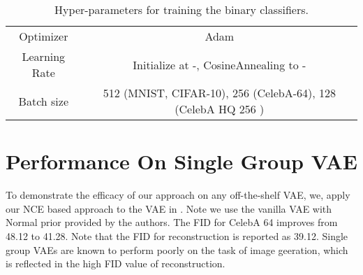 \documentclass{article} \usepackage{iclr2021_conference,times}
\begin{document}
\begin{table}[h]
\centering
{}
\end{table}

\begin{table}[h]
\centering
\begin{tabular}{c||c}
    Optimizer & Adam \citep{kingma2014adam} \\ 
    Learning Rate & Initialize at -, CosineAnnealing \citep{loshchilov2016sgdr} to - \\
    Batch size & 512 \small{(MNIST, CIFAR-10)}, 256 \small{(CelebA-64)}, 128 \small{(CelebA HQ 256 )} 
\end{tabular}
\caption{Hyper-parameters for training the binary classifiers.}
\label{tab:hyperparam_sac}
\end{table}

\section{Performance On Single Group VAE} \label{app:single VAE}
To demonstrate the efficacy of our approach on any off-the-shelf VAE, we, apply our NCE based approach to the VAE in \citep{ghosh2020deterministicVAE}. Note we use the vanilla VAE with Normal prior provided by the authors. The FID for CelebA 64 improves from 48.12 to 41.28. Note that the FID for reconstruction is reported as 39.12. Single group VAEs are known to perform poorly on the task of image geeration, which is reflected in the high FID value of reconstruction.
\end{document}
